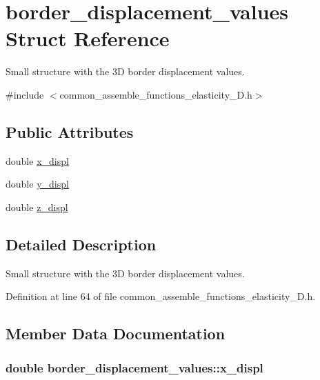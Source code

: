 \hypertarget{structborder__displacement__values}{}\section{border\+\_\+displacement\+\_\+values Struct Reference}
\label{structborder__displacement__values}


Small structure with the 3\+D border displacement values.  




{\ttfamily \#include $<$common\+\_\+assemble\+\_\+functions\+\_\+elasticity\+\_\+D.\+h$>$}

\subsection*{Public Attributes}
\begin{DoxyCompactItemize}
\item 
double \hyperlink{structborder__displacement__values_a79fb24700b001a0e4089816f6e9596b1}{x\+\_\+displ}
\item 
double \hyperlink{structborder__displacement__values_add771bac55cf12535ad4329d92c81d92}{y\+\_\+displ}
\item 
double \hyperlink{structborder__displacement__values_a2c7c653e236a44f295db2d74ced8706b}{z\+\_\+displ}
\end{DoxyCompactItemize}


\subsection{Detailed Description}
Small structure with the 3\+D border displacement values. 

Definition at line 64 of file common\+\_\+assemble\+\_\+functions\+\_\+elasticity\+\_\+D.\+h.



\subsection{Member Data Documentation}
\hypertarget{structborder__displacement__values_a79fb24700b001a0e4089816f6e9596b1}{}
\subsubsection[{x\+\_\+displ}]{\setlength{\rightskip}{0pt plus 5cm}double border\+\_\+displacement\+\_\+values\+::x\+\_\+displ}\label{structborder__displacement__values_a79fb24700b001a0e4089816f6e9596b1}


